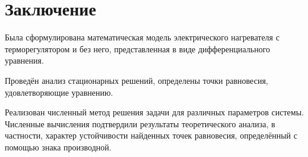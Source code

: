 \chapter{Заключение}
Была сформулирована математическая модель электрического нагревателя с терморегулятором и без него, представленная в виде дифференциального уравнения.

Проведён анализ стационарных решений, определены точки равновесия, удовлетворяющие уравнению.

Реализован численный метод решения задачи для различных параметров системы. Численные вычисления подтвердили результаты теоретического анализа, в частности, характер устойчивости найденных точек равновесия, определённый с помощью знака производной.